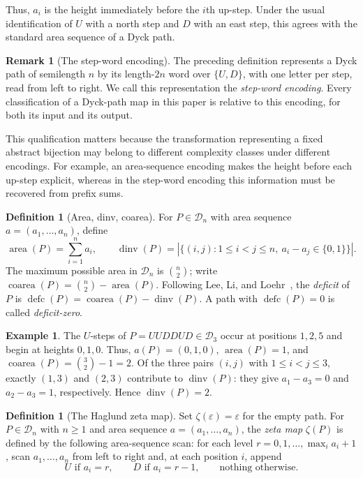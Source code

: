 \documentclass[11pt]{article}
\theoremstyle{definition}
\newtheorem{definition}[theorem]{Definition}
\newtheorem{example}[theorem]{Example}
\newtheorem{remark}[theorem]{Remark}
\newcommand{\D}{\mathcal D}
\newcommand{\area}{\operatorname{area}}
\newcommand{\dinv}{\operatorname{dinv}}
\newcommand{\coarea}{\operatorname{coarea}}
\newcommand{\defc}{\operatorname{defc}}
\begin{document}
Thus, $a_i$ is the height immediately before the $i$th up-step.  Under the
usual identification of $U$ with a north step and $D$ with an east step,
this agrees with the standard area sequence of a Dyck path.

\begin{remark}[The step-word encoding]\label{rmk:step-word}
The preceding definition represents a Dyck path of semilength $n$ by its
length-$2n$ word over $\{U,D\}$, with one letter per step, read from left to
right.  We call this representation the \emph{step-word encoding}.  Every
classification of a Dyck-path map in this paper is relative to this encoding,
for both its input and its output.

This qualification matters because the transformation representing a fixed
abstract bijection may belong to different complexity classes under different
encodings.  For example, an area-sequence encoding makes the height before
each up-step explicit, whereas in the step-word encoding this information must
be recovered from prefix sums.
\end{remark}

\begin{definition}[Area, dinv, coarea]
For $P\in\D_n$ with area sequence $a=(a_1,\ldots,a_n)$, define
\[
   \area(P)=\sum_{i=1}^n a_i,\qquad
   \dinv(P)=|\{(i,j):1\le i<j\le n,\ a_i-a_j\in\{0,1\}\}|.
\]
The maximum possible area in $\D_n$ is $\binom n2$; write
$\coarea(P)=\binom n2-\area(P)$.  Following Lee, Li, and
Loehr~\cite{LeeLiLoehr2018}, the \emph{deficit} of $P$ is
$\defc(P)=\coarea(P)-\dinv(P)$.
A path with $\defc(P)=0$ is called \emph{deficit-zero}.
\end{definition}

\begin{example}\label{ex:UUDDUD}
The $U$-steps of $P=UUDDUD\in\D_3$ occur at positions $1,2,5$ and begin at
heights $0,1,0$.  Thus, $a(P)=(0,1,0)$, $\area(P)=1$, and
$\coarea(P)=\binom32-1=2$.
Of the three pairs $(i,j)$ with $1\le i<j\le3$, exactly $(1,3)$ and
$(2,3)$ contribute to $\dinv(P)$: they give
$a_1-a_3=0$ and $a_2-a_3=1$, respectively.  Hence $\dinv(P)=2$.
\end{example}

\begin{definition}[The Haglund zeta map]\label{def:zeta}
Set $\zeta(\varepsilon)=\varepsilon$ for the empty path.  For
$P\in\D_n$ with $n\ge 1$ and area sequence $a=(a_1,\ldots,a_n)$, the
\emph{zeta map} $\zeta(P)$ is defined by the following area-sequence scan: for
each level $r=0,1,\ldots,\max_i a_i+1$, scan $a_1,\ldots,a_n$ from left to
right and, at each position $i$, append
\[
   U\text{ if }a_i=r,\qquad D\text{ if }a_i=r-1,\qquad
   \text{nothing otherwise.}
\]
\end{definition}
\end{document}
